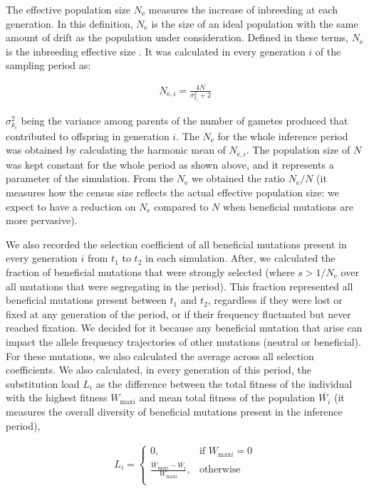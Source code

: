 \documentclass[a4paper, 12pt]{article}
\begin{document}
The effective population size $N_{\mathrm{e}}$ measures the increase of inbreeding at each generation. In this definition, $N_{\mathrm{e}}$ is the size of an ideal population with the same amount of drift as the population under consideration. Defined in these terms, $N_{\mathrm{e}}$ is the inbreeding effective size \citep{Santiago:1995wx, Walsh:2018tv}. It was calculated in every generation $i$ of the sampling period as:

\begin{gather*}
    N_{\mathrm{e},i} = \frac{4N}{\sigma^2_{k_i} + 2} 
\end{gather*}

\noindent $\sigma^2_{k_i}$ being the variance among parents of the number of gametes produced that contributed to offspring in generation $i$. The $N_\mathrm{e}$ for the whole inference period was obtained by calculating the harmonic mean of $N_{\mathrm{e},i}$. The population size of $N$ was kept constant for the whole period as shown above, and it represents a parameter of the simulation. From the $N_\mathrm{e}$ we obtained the ratio $N_\mathrm{e}/N$ (it measures how the census size reflects the actual effective population size: we expect to have a reduction on $N_{\mathrm{e}}$ compared to $N$ when beneficial mutations are more pervasive). 

We also recorded the selection coefficient of all beneficial mutations present in every generation $i$ from $t_1$ to $t_2$ in each simulation. After, we calculated the fraction of beneficial mutations that were strongly selected (where $s > 1/N_{\mathrm{e}}$ over all mutations that were segregating in the period). This fraction represented all beneficial mutations present between $t_1$ and $t_2$, regardless if they were lost or fixed at any generation of the period, or if their frequency fluctuated but never reached fixation. We decided for it because any beneficial mutation that arise can impact the allele frequency trajectories of other mutations (neutral or beneficial). For these mutations, we also calculated the average across all selection coefficients. We also calculated, in every generation of this period, the substitution load $L_i$ as the difference between the total fitness of the individual with the highest fitness $W_{\mathrm{max}i}$ and mean total fitness of the population $\bar{W_{i}}$ (it measures the overall diversity of beneficial mutations present in the inference period),

\begin{gather*}
    L_i = 
\begin{cases}
    0, & \text{if } W_{\mathrm{max}i}=0\\
    \frac{W_{\mathrm{max}i} - \bar{W_{i}}}{W_{\mathrm{max}i}},& \text{otherwise}\\
\end{cases}
\end{gather*}
\end{document}
